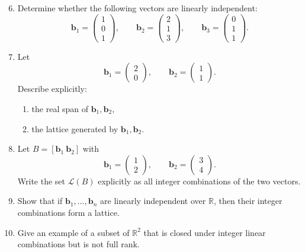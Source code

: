 \documentclass[11pt]{article}
\begin{document}
\begin{enumerate}
	\setcounter{enumi}{5}
	\item Determine whether the following vectors are linearly independent:
	\[
	\mathbf{b}_1=
	\begin{pmatrix}
		1\\0\\1
	\end{pmatrix},
	\qquad
	\mathbf{b}_2=
	\begin{pmatrix}
		2\\1\\3
	\end{pmatrix},
	\qquad
	\mathbf{b}_3=
	\begin{pmatrix}
		0\\1\\1
	\end{pmatrix}.
	\]
	
	\item Let
	\[
	\mathbf{b}_1=
	\begin{pmatrix}
		2\\0
	\end{pmatrix},
	\qquad
	\mathbf{b}_2=
	\begin{pmatrix}
		1\\1
	\end{pmatrix}.
	\]
	Describe explicitly:
	\begin{enumerate}
		\item the real span of \(\mathbf{b}_1,\mathbf{b}_2\),
		\item the lattice generated by \(\mathbf{b}_1,\mathbf{b}_2\).
	\end{enumerate}
	
	\item Let \(B=[\mathbf{b}_1\ \mathbf{b}_2]\) with
	\[
	\mathbf{b}_1=
	\begin{pmatrix}
		1\\2
	\end{pmatrix},
	\qquad
	\mathbf{b}_2=
	\begin{pmatrix}
		3\\4
	\end{pmatrix}.
	\]
	Write the set \(\mathcal{L}(B)\) explicitly as all integer combinations of the two vectors.
	
	\item Show that if \(\mathbf{b}_1,\dots,\mathbf{b}_n\) are linearly independent over \(\mathbb{R}\), then their integer combinations form a lattice.
	
	\item Give an example of a subset of \(\mathbb{R}^2\) that is closed under integer linear combinations but is not full rank.
\end{enumerate}
\end{document}
